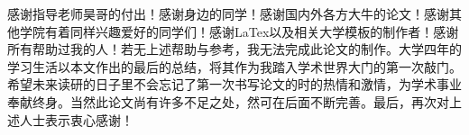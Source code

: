 \begin{acknowledgement}
    感谢指导老师昊哥的付出！感谢身边的同学！感谢国内外各方大牛的论文！感谢其他学院有着同样兴趣爱好的同学们！感谢LaTex以及相关大学模板的制作者！感谢所有帮助过我的人！若无上述帮助与参考，我无法完成此论文的制作。大学四年的学习生活以本文作出的最后的总结，将其作为我踏入学术世界大门的第一次敲门。希望未来读研的日子里不会忘记了第一次书写论文的时的热情和激情，为学术事业奉献终身。当然此论文尚有许多不足之处，然可在后面不断完善。最后，再次对上述人士表示衷心感谢！
\end{acknowledgement}